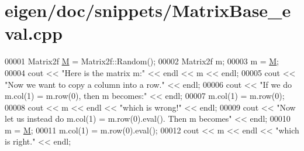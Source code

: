 \hypertarget{eigen_2doc_2snippets_2_matrix_base__eval_8cpp_source}{}\section{eigen/doc/snippets/\+Matrix\+Base\+\_\+eval.cpp}
\label{eigen_2doc_2snippets_2_matrix_base__eval_8cpp_source}

\begin{DoxyCode}
00001 Matrix2f \hyperlink{group___core___module_class_eigen_1_1_matrix}{M} = Matrix2f::Random();
00002 Matrix2f m;
00003 m = \hyperlink{group___core___module_class_eigen_1_1_matrix}{M};
00004 cout << \textcolor{stringliteral}{"Here is the matrix m:"} << endl << m << endl;
00005 cout << \textcolor{stringliteral}{"Now we want to copy a column into a row."} << endl;
00006 cout << \textcolor{stringliteral}{"If we do m.col(1) = m.row(0), then m becomes:"} << endl;
00007 m.col(1) = m.row(0);
00008 cout << m << endl << \textcolor{stringliteral}{"which is wrong!"} << endl;
00009 cout << \textcolor{stringliteral}{"Now let us instead do m.col(1) = m.row(0).eval(). Then m becomes"} << endl;
00010 m = \hyperlink{group___core___module_class_eigen_1_1_matrix}{M};
00011 m.col(1) = m.row(0).eval();
00012 cout << m << endl << \textcolor{stringliteral}{"which is right."} << endl;
\end{DoxyCode}
